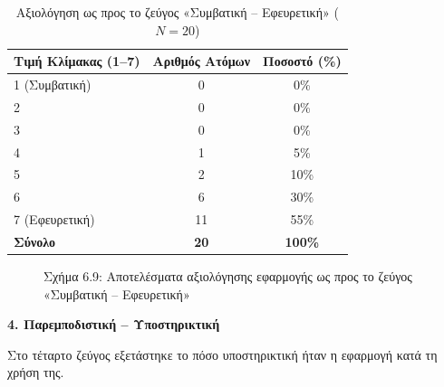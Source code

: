 \documentclass[twoside, a4paper, 11pt]{article}
\begin{document}
\begin{table}[H]
    \centering
    \caption{Αξιολόγηση ως προς το ζεύγος «Συμβατική – Εφευρετική» ($N = 20$)}
    \begin{tabular}{|l|c|c|}
        \hline
        \textbf{Τιμή Κλίμακας (1–7)} & \textbf{Αριθμός Ατόμων} & \textbf{Ποσοστό (\%)} \\ \hline
        1 (Συμβατική) & 0 & 0\% \\ \hline
        2 & 0 & 0\% \\ \hline
        3 & 0 & 0\% \\ \hline
        4 & 1 & 5\% \\ \hline
        5 & 2 & 10\% \\ \hline
        6 & 6 & 30\% \\ \hline
        7 (Εφευρετική) & 11 & 55\% \\ \hline
        \textbf{Σύνολο} & \textbf{20} & \textbf{100\%} \\ \hline
    \end{tabular}
\end{table}

\begin{figure}[H]
    \centering
    \caption{Σχήμα 6.9: Αποτελέσματα αξιολόγησης εφαρμογής ως προς το ζεύγος «Συμβατική – Εφευρετική»}
\end{figure}

\vspace{1em}
\noindent\textbf{4. Παρεμποδιστική – Υποστηρικτική}

Στο τέταρτο ζεύγος εξετάστηκε το πόσο υποστηρικτική ήταν η εφαρμογή κατά τη χρήση της.
\end{document}
